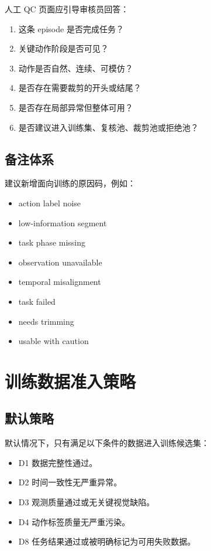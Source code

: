 \documentclass[UTF8,zihao=-4,oneside,openany]{ctexrep}
\begin{document}
人工 QC 页面应引导审核员回答：

\begin{enumerate}
  \item 这条 episode 是否完成任务？
  \item 关键动作阶段是否可见？
  \item 动作是否自然、连续、可模仿？
  \item 是否存在需要裁剪的开头或结尾？
  \item 是否存在局部异常但整体可用？
  \item 是否建议进入训练集、复核池、裁剪池或拒绝池？
\end{enumerate}

\subsection{备注体系}

建议新增面向训练的原因码，例如：

\begin{itemize}
  \item action label noise
  \item low-information segment
  \item task phase missing
  \item observation unavailable
  \item temporal misalignment
  \item task failed
  \item needs trimming
  \item usable with caution
\end{itemize}

\section{训练数据准入策略}

\subsection{默认策略}

默认情况下，只有满足以下条件的数据进入训练候选集：

\begin{itemize}
  \item D1 数据完整性通过。
  \item D2 时间一致性无严重异常。
  \item D3 观测质量通过或无关键视觉缺陷。
  \item D4 动作标签质量无严重污染。
  \item D8 任务结果通过或被明确标记为可用失败数据。
\end{itemize}
\end{document}
